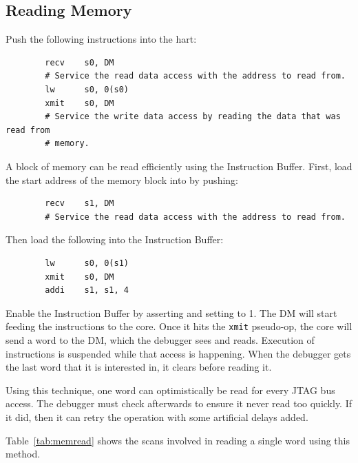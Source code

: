 \documentclass{article}
\begin{document}
\subsection{Reading Memory}

Push the following instructions into the hart:
\begin{verbatim}
        recv    s0, DM
        # Service the read data access with the address to read from.
        lw      s0, 0(s0)
        xmit    s0, DM
        # Service the write data access by reading the data that was read from
        # memory.
\end{verbatim}

A block of memory can be read efficiently using the Instruction Buffer. First,
load the start address of the memory block into \Sone by pushing:
\begin{verbatim}
        recv    s1, DM
        # Service the read data access with the address to read from.
\end{verbatim}

Then load the following into the Instruction Buffer:
\begin{verbatim}
        lw      s0, 0(s1)
        xmit    s0, DM
        addi    s1, s1, 4
\end{verbatim}

Enable the Instruction Buffer by asserting \Fibufenable and setting
\Fibufaction to 1. The DM will start feeding the instructions to the core. Once
it hits the {\tt xmit} pseudo-op, the core will send a word to the DM, which
the debugger sees and reads. Execution of instructions is suspended while that
access is happening.  When the debugger gets the last word that it is
interested in, it clears \Fibufenable before reading it.

Using this technique, one word can optimistically be read for every JTAG bus
access. The debugger must check \Fdunderflow afterwards to ensure it never read
too quickly. If it did, then it can retry the operation with some artificial
delays added.

Table~\ref{tab:memread} shows the scans involved in reading a single word using
this method.
\end{document}
